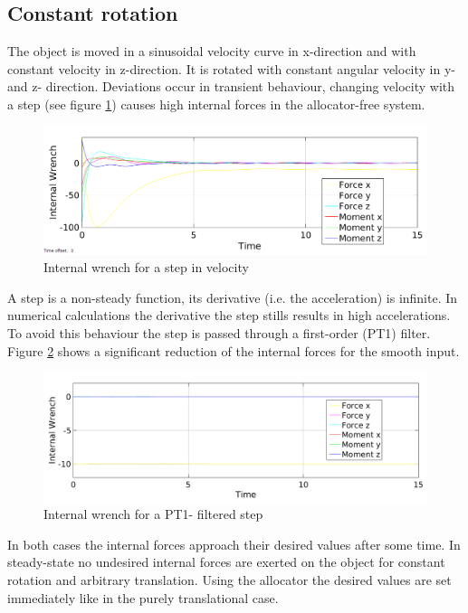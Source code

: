 \documentclass[conference]{IEEEtran}
\begin{document}
\subsection{Constant rotation}  
The object is moved in a sinusoidal velocity curve in x-direction and with constant velocity in z-direction. It is rotated with constant angular velocity in y- and z- direction. Deviations occur in transient behaviour, changing velocity with a step (see figure \ref{IntForceStep}) causes high internal forces in the allocator-free system.
\begin{figure}
\includegraphics[width=\linewidth]{IntForceStep2}
\caption{Internal wrench for a step in velocity}
\label{IntForceStep}
\end{figure}
 A step is a non-steady function, its derivative (i.e. the acceleration) is infinite. In numerical calculations the derivative the step stills results in high accelerations. To avoid this behaviour the step is passed through a first-order (PT1) filter. Figure \ref{IntForcePT1} shows a significant reduction of the internal forces for the smooth input. 
\begin{figure}
\includegraphics[width=\linewidth]{IntForcePT1}
\caption{Internal wrench for a PT1- filtered step}
\label{IntForcePT1}
\end{figure}
In both cases the internal forces approach their desired values after some time. In steady-state no undesired internal forces are exerted on the object for constant rotation and arbitrary translation. Using the allocator the desired values are set immediately like in the purely translational case.\\
\end{document}

